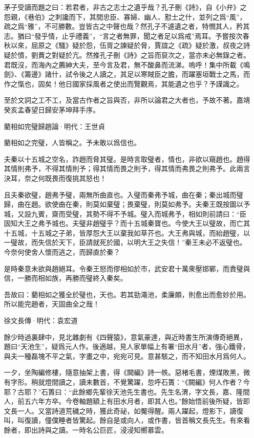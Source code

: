 \documentclass[12pt,a4paper]{ctexbook}
\begin{document}
茅子受讀而題之曰：若君者，非古之志士之遺乎哉？孔子刪《詩》，自《小弁》之怨親，《巷伯》之刺讒而下，其間忠臣、寡婦、幽人、懟士之什，並列之爲“風”，疏之爲“雅”，不可勝數。豈皆古之中聲也哉？然孔子不遽遺之者，特憫其人，矜其志。猶曰“發乎情，止乎禮義”，“言之者無罪，聞之者足以爲戒”焉耳。予嘗按次春秋以來，屈原之《騷》疑於怨，伍胥之諫疑於脅，賈誼之《疏》疑於激，叔夜之詩疑於憤，劉蕡之對疑於亢。然推孔子刪《詩》之旨而裒次之，當亦未必無錄之者。君既沒，而海內之薦紳大夫，至今言及君，無不酸鼻而流涕。嗚呼！集中所載《鳴劍》、《籌邊》諸什，試令後之人讀之，其足以寒賊臣之膽，而躍塞垣戰士之馬，而作之愾也，固矣！他日國家採風者之使出而覽觀焉，其能遺之也乎？予謹識之。\par
至於文詞之工不工，及當古作者之旨與否，非所以論君之大者也，予故不著。嘉靖癸亥孟春望日歸安茅坤拜手序。\par
藺相如完璧歸趙論·明代：王世貞 \par
藺相如之完璧，人皆稱之。予未敢以爲信也。\par
夫秦以十五城之空名，詐趙而脅其璧。是時言取璧者，情也，非欲以窺趙也。趙得其情則弗予，不得其情則予；得其情而畏之則予，得其情而弗畏之則弗予。此兩言決耳，奈之何既畏而復挑其怒也！\par
且夫秦欲璧，趙弗予璧，兩無所曲直也。入璧而秦弗予城，曲在秦；秦出城而璧歸，曲在趙。欲使曲在秦，則莫如棄璧；畏棄璧，則莫如弗予。夫秦王既按圖以予城，又設九賓，齋而受璧，其勢不得不予城。璧入而城弗予，相如則前請曰：“臣固知大王之弗予城也。夫璧非趙璧乎？而十五城秦寶也。今使大王以璧故，而亡其十五城，十五城之子弟，皆厚怨大王以棄我如草芥也。大王弗與城，而紿趙璧，以一璧故，而失信於天下，臣請就死於國，以明大王之失信！”秦王未必不返璧也。今奈何使舍人懷而逃之，而歸直於秦？\par
是時秦意未欲與趙絕耳。令秦王怒而僇相如於市，武安君十萬衆壓邯鄲，而責璧與信，一勝而相如族，再勝而璧終入秦矣。\par
吾故曰：藺相如之獲全於璧也，天也。若其勁澠池，柔廉頗，則愈出而愈妙於用。所以能完趙者，天固曲全之哉！\par
徐文長傳·明代：袁宏道 \par
餘少時過裏肆中，見北雜劇有《四聲猿》，意氣豪達，與近時書生所演傳奇絕異，題曰“天池生”，疑爲元人作。後適越，見人家單幅上有署“田水月”者，強心鐵骨，與夫一種磊塊不平之氣，字畫之中，宛宛可見。意甚駭之，而不知田水月爲何人。\par
一夕，坐陶編修樓，隨意抽架上書，得《闕編》詩一帙。惡楮毛書，煙煤敗黑，微有字形。稍就燈間讀之，讀未數首，不覺驚躍，忽呼石簣：“《闕編》何人作者？今耶？古耶？”石簣曰：“此餘鄉先輩徐天池先生書也。先生名渭，字文長，嘉、隆間人，前五六年方卒。今卷軸題額上有田水月者，即其人也。”餘始悟前後所疑，皆即文長一人。又當詩道荒穢之時，獲此奇祕，如魘得醒。兩人躍起，燈影下，讀復叫，叫復讀，僮僕睡者皆驚起。餘自是或向人，或作書，皆首稱文長先生。有來看餘者，即出詩與之讀。一時名公巨匠，浸浸知嚮慕雲。\par
\end{document}
